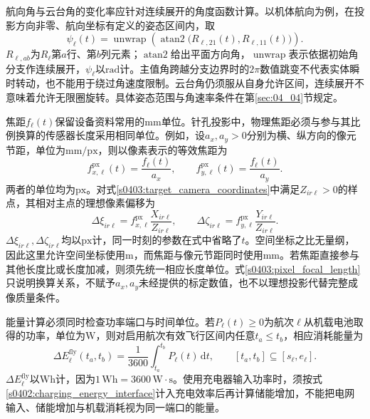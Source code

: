 航向角与云台角的变化率应针对连续展开的角度函数计算。以机体航向为例，在投影方向非零、航向坐标有定义的姿态区间内，取
\begin{equation}
 \psi_\ell(t)=\operatorname{unwrap}
 \left(\operatorname{atan2}\bigl(R_{\ell,21}(t),R_{\ell,11}(t)\bigr)\right).
 \label{s0403:heading_unwrap}
\end{equation}
$R_{\ell,ab}$为$R_\ell$第$a$行、第$b$列元素；$\operatorname{atan2}$给出平面方向角，$\operatorname{unwrap}$表示依据初始角分支作连续展开，$\psi_\ell$以$\mathrm{rad}$计。主值角跨越分支边界时的$2\pi$数值跳变不代表实体瞬时转动，也不能用于绕过角速度限制。云台角仍须服从自身允许区间，连续展开不意味着允许无限圈旋转。具体姿态范围与角速率条件在第\ref{sec:04_04}节规定。

焦距$f_\ell(t)$保留设备资料常用的$\mathrm{mm}$单位。针孔投影中，物理焦距必须与参与其比例换算的传感器长度采用相同单位。例如，设$a_x,a_y>0$分别为横、纵方向的像元节距，单位为$\mathrm{mm/px}$，则以像素表示的等效焦距为
\begin{equation}
 f_{x,\ell}^{\mathrm{px}}(t)=\frac{f_\ell(t)}{a_x},
 \qquad
 f_{y,\ell}^{\mathrm{px}}(t)=\frac{f_\ell(t)}{a_y}.
 \label{s0403:pixel_focal_length}
\end{equation}
两者的单位均为$\mathrm{px}$。对式\eqref{s0403:target_camera_coordinates}中满足$Z_{ir\ell}>0$的样点，其相对主点的理想像素偏移为
\begin{equation}
 \Delta\xi_{ir\ell}
 =f_{x,\ell}^{\mathrm{px}}\frac{X_{ir\ell}}{Z_{ir\ell}},
 \qquad
 \Delta\zeta_{ir\ell}
 =f_{y,\ell}^{\mathrm{px}}\frac{Y_{ir\ell}}{Z_{ir\ell}}.
 \label{s0403:projection_units}
\end{equation}
$\Delta\xi_{ir\ell},\Delta\zeta_{ir\ell}$均以$\mathrm{px}$计，同一时刻的参数在式中省略了$t$。空间坐标之比无量纲，因此这里允许空间坐标使用$\mathrm m$，而焦距与像元节距同时使用$\mathrm{mm}$。若焦距直接参与其他长度比或长度加减，则须先统一相应长度单位。式\eqref{s0403:pixel_focal_length}只说明换算关系，不赋予$a_x,a_y$未经提供的标定数值，也不以理想投影代替完整成像质量条件。

能量计算必须同时检查功率端口与时间单位。若$P_\ell(t)\ge0$为航次$\ell$从机载电池取得的功率，单位为$\mathrm W$，则对启用航次有效飞行区间内任意$t_a\le t_b$，相应消耗能量为
\begin{equation}
 \Delta E_\ell^{\mathrm{fly}}(t_a,t_b)
 =\frac{1}{3600}\int_{t_a}^{t_b}P_\ell(t)\,\mathrm dt,
 \qquad [t_a,t_b]\subseteq[s_\ell,e_\ell].
 \label{s0403:flight_energy_units}
\end{equation}
$\Delta E_\ell^{\mathrm{fly}}$以$\mathrm{Wh}$计，因为$1\,\mathrm{Wh}=3600\,\mathrm W\cdot\mathrm s$。使用充电器输入功率时，须按式\eqref{s0402:charging_energy_interface}计入充电效率后再计算储能增加，不能把电网输入、储能增加与机载消耗视为同一端口的能量。


